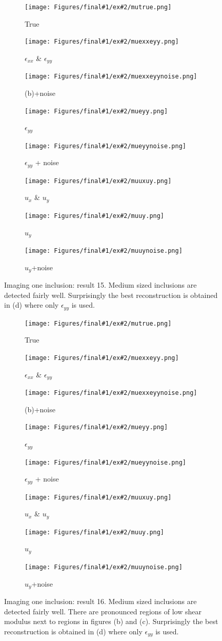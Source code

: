 \documentclass[12pt]{article}
\newcommand{\nhgscalefactor}{0.2}
\newcommand{\mupics}[3]{
  \begin{subfigure}[b]{\nhgscalefactor\linewidth}
    \texttt{[image: Figures/final\#1/ex\#2/mutrue.png]}
    \caption{True}
  \end{subfigure}
  \hfill
  \begin{subfigure}[b]{\nhgscalefactor\linewidth}
    \texttt{[image: Figures/final\#1/ex\#2/muexxeyy.png]}
    \caption{$\epsilon_{xx}$ \& $\epsilon_{yy}$}
  \end{subfigure}
  \hfill
  \begin{subfigure}[b]{\nhgscalefactor\linewidth}
    \texttt{[image: Figures/final\#1/ex\#2/muexxeyynoise.png]}
    \caption{(b)+noise}
  \end{subfigure}
  \hfill
  \begin{subfigure}[b]{\nhgscalefactor\linewidth}
    \texttt{[image: Figures/final\#1/ex\#2/mueyy.png]}
    \caption{$\epsilon_{yy}$}
  \end{subfigure}
  \begin{subfigure}[b]{\nhgscalefactor\linewidth}
    \texttt{[image: Figures/final\#1/ex\#2/mueyynoise.png]}
    \caption{$\epsilon_{yy}$ + noise}
  \end{subfigure}
  \hfill
  \begin{subfigure}[b]{\nhgscalefactor\linewidth}
    \texttt{[image: Figures/final\#1/ex\#2/muuxuy.png]}
    \caption{$u_{x}$ \& $u_y$}
  \end{subfigure}
  \hfill
  \begin{subfigure}[b]{\nhgscalefactor\linewidth}
    \texttt{[image: Figures/final\#1/ex\#2/muuy.png]}
    \caption{$u_y$}
  \end{subfigure}
  \hfill
  \begin{subfigure}[b]{\nhgscalefactor\linewidth}
    \texttt{[image: Figures/final\#1/ex\#2/muuynoise.png]}
    \caption{$u_y$+noise}
  \end{subfigure}
}
\begin{document}
\newpage
\clearpage
\begin{figure}[h]
  \mupics{1}{15}{fig:oneinc:15}
  \caption{\label{fig:oneinc:15}Imaging one inclusion: result 15. Medium sized inclusions are detected fairly well. Surprisingly the best reconstruction is obtained in (d) where only $\epsilon_{yy}$ is used. }
\end{figure}
\newpage
\clearpage
\begin{figure}[h]
  \mupics{1}{16}{fig:oneinc:16}
  \caption{\label{fig:oneinc:16}Imaging one inclusion: result 16. Medium sized inclusions are detected fairly well.  There are pronounced regions of low shear modulus next to regions in figures (b) and (c). Surprisingly the best reconstruction is obtained in (d) where only $\epsilon_{yy}$ is used.}
\end{figure}
\newpage
\clearpage
%
\end{document}
